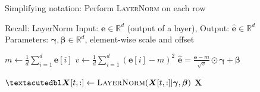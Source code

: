 \documentclass[12pt,aspectratio=169,handout]{beamer}
\begin{document}
\begin{frame}{Simplifying notation: Perform \textsc{LayerNorm} on each row}
	
	\begin{block}{Recall: LayerNorm}
		Input: $\bm{e} \in \mathbb{R}^{d}$ (output of a layer), Output: $\bm{\hat e} \in \mathbb{R}^{d}$ \\
		Parameters: $\bm{\gamma}, \bm{\beta} \in \mathbb{R}^{d}$, element-wise scale and offset
		
		\begin{algorithmic}[1]
			\State $m \gets \frac{1}{d} \sum_{i = 1}^{d} \bm{e}[i]$
			\State $v \gets \frac{1}{d} \sum_{i = 1}^{d} (\bm{e}[i] - m)^2$
			\State \Return $\bm{\hat e} = \frac{\bm{e} - m}{\sqrt{v}} \odot \bm{\gamma} + \bm{\beta}$
			\EndFunction
		\end{algorithmic}
	\end{block}
	
	
	\begin{algorithmic}[1]
		\State $˝\bm{X}[t,:] \gets \textsc{LayerNorm}(\bm{X}{[t,:]} | \bm{\gamma}, \bm{\beta})$
		\EndFor
		\State \Return $\bm{X}$
		\EndFunction
	\end{algorithmic}
	
	
\end{frame}
\end{document}
